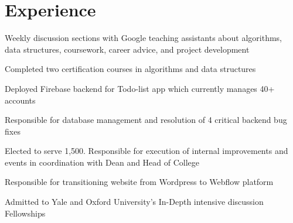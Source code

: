 \documentclass[]{deedy-resume-openfont}
\begin{document}
\begin{minipage}[t]{0.69\textwidth} 


\section{Experience}

\bigskip
\begin{tightemize}
\item Weekly discussion sections with Google teaching assistants about algorithms, data structures, coursework, career advice, and project development
\item Completed two certification courses in algorithms and data structures
\end{tightemize}
\sectionsep

\begin{tightemize}
\item Deployed Firebase backend for Todo-list app which currently manages 40+ accounts
\item Responsible for database management and resolution of 4 critical backend bug fixes
\end{tightemize}
\sectionsep

\begin{tightemize}
\item Elected to serve 1,500. Responsible for execution of internal improvements and events in coordination with Dean and Head of College
\end{tightemize}
\sectionsep

\begin{tightemize}
\item Responsible for transitioning website from Wordpress to Webflow platform
\item Admitted to Yale and Oxford University's In-Depth intensive discussion Fellowships
\end{tightemize}
\sectionsep


\end{minipage}
\end{document}
